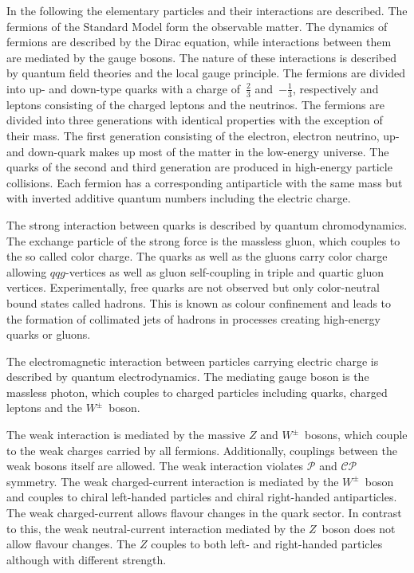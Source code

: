 In the following the elementary particles and their interactions are described.
The fermions of the Standard Model form the observable matter. The dynamics of
fermions are described by the Dirac equation, while interactions between them
are mediated by the gauge bosons. The nature of these interactions is described
by quantum field theories and the local gauge principle. The fermions are
divided into up- and down-type quarks with a charge of~$\frac{2}{3}$
and~$-\frac{1}{3}$, respectively and leptons consisting of the charged leptons
and the neutrinos. The fermions are divided into three generations with
identical properties with the exception of their mass. The first generation
consisting of the electron, electron neutrino, up- and down-quark makes up most
of the matter in the low-energy universe. The quarks of the second and third
generation are produced in high-energy particle collisions. Each fermion has a
corresponding antiparticle with the same mass but with inverted additive quantum
numbers including the electric charge.

The strong interaction between quarks is described by quantum chromodynamics.
The exchange particle of the strong force is the massless gluon, which couples
to the so called color charge. The quarks as well as the gluons carry color
charge allowing $qqg$-vertices as well as gluon self-coupling in triple and
quartic gluon vertices. Experimentally, free quarks are not observed but only
color-neutral bound states called hadrons. This is known as colour confinement
and leads to the formation of collimated jets of hadrons in processes creating
high-energy quarks or gluons.

The electromagnetic interaction between particles carrying electric charge is
described by quantum electrodynamics. The mediating gauge boson is the massless
photon, which couples to charged particles including quarks, charged leptons and
the $W^\pm$~boson.

The weak interaction is mediated by the massive $Z$ and $W^\pm$~bosons, which
couple to the weak charges carried by all fermions. Additionally, couplings
between the weak bosons itself are allowed. The weak interaction violates
$\mathcal{P}$ and $\mathcal{CP}$ symmetry. The weak charged-current interaction
is mediated by the $W^\pm$~boson and couples to chiral left-handed particles and
chiral right-handed antiparticles. The weak charged-current allows flavour
changes in the quark sector. In contrast to this, the weak neutral-current
interaction mediated by the $Z$~boson does not allow flavour changes. The
$Z$ couples to both left- and right-handed particles although with different
strength.

